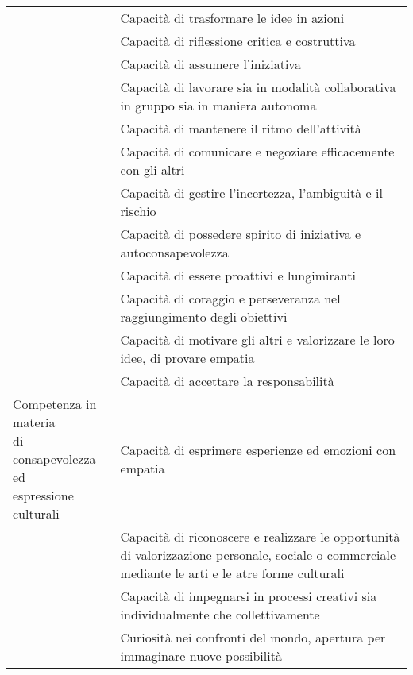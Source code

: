 \begin{tabular}{m{4cm}p{12.0cm}}
& Capacità di trasformare le idee in azioni\\
& Capacità di riflessione critica e costruttiva \\
	&Capacità di assumere l'iniziativa\\
	& Capacità di lavorare sia in modalità collaborativa in gruppo sia in maniera autonoma\\
	& Capacità di mantenere il ritmo dell'attività\\
	& Capacità di comunicare e negoziare efficacemente con gli altri\\
	& Capacità di gestire l'incertezza, l'ambiguità e il rischio\\
	& Capacità di possedere spirito di iniziativa e autoconsapevolezza\\
	& Capacità di essere proattivi e lungimiranti\\
	& Capacità di coraggio e perseveranza nel raggiungimento degli obiettivi\\
	& Capacità di motivare gli altri e valorizzare le loro idee, di provare empatia\\
	& Capacità di accettare la responsabilità  \\
	\midrule
	\multirowcell{2}{Competenza in materia\\ di
		consapevolezza ed\\ espressione culturali
}& Capacità di esprimere esperienze ed emozioni con empatia\\
	& Capacità di riconoscere e realizzare le opportunità di valorizzazione personale,
sociale o commerciale mediante le arti e le atre forme culturali\\
& Capacità di impegnarsi in processi creativi sia individualmente che collettivamente\\
& Curiosità nei confronti del mondo, apertura per immaginare nuove possibilità\\
\bottomrule
\end{tabular}
